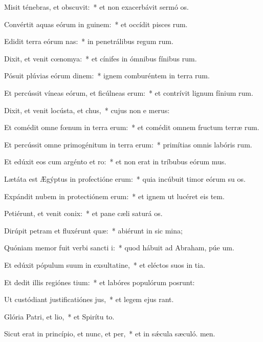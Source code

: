 \item Misit ténebras, et obscuvit:~* et non exacerbávit sermó os.
\item Convértit aquas eórum in guinem:~* et occídit pisces rum.
\item Edidit terra eórum nas:~* in penetrálibus regum rum.
\item Dixit, et venit cœnomya:~* et cínifes in ómnibus fínibus rum.
\item Pósuit plúvias eórum dinem:~* ignem comburéntem in terra rum.
\item Et percússit víneas eórum, et ficúlneas erum:~* et contrívit lignum fínium rum.
\item Dixit, et venit locústa, et chus,~* cujus non e merus:
\item Et comédit omne fœnum in terra erum:~* et comédit omnem fructum terræ rum.
\item Et percússit omne primogénitum in terra erum:~* primítias omnis labóris rum.
\item Et edúxit eos cum argénto et ro:~* et non erat in tríbubus eórum mus.
\item Lætáta est Ægýptus in profectióne erum:~* quia incúbuit timor eórum su os.
\item Expándit nubem in protectiónem erum:~* et ignem ut lucéret eis  tem.
\item Petiérunt, et venit conix:~* et pane cæli saturá os.
\item Dirúpit petram et fluxérunt quæ:~* abiérunt in sic mina;
\item Quóniam memor fuit verbi sancti i:~* quod hábuit ad Abraham, púe um.
\item Et edúxit pópulum suum in exsultatine,~* et eléctos suos in tia.
\item Et dedit illis regiónes tium:~* et labóres populórum posrunt:
\item Ut custódiant justificatiónes jus,~* et legem ejus rant.
\item Glória Patri, et lio,~* et Spirítu to.
\item Sicut erat in princípio, et nunc, et per,~* et in sǽcula sæculó. men.
